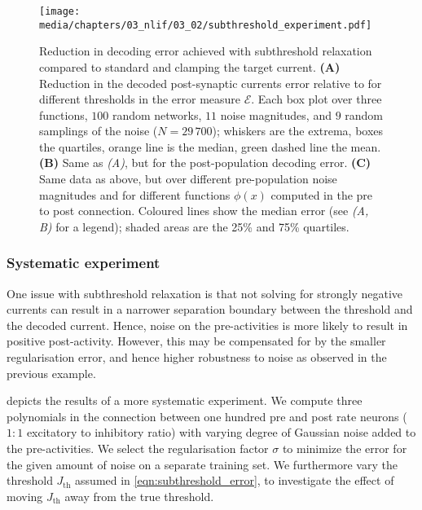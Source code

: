 \begin{figure}[t]
	\texttt{[image: media/chapters/03\_nlif/03\_02/subthreshold\_experiment.pdf]}%
	{\label{fig:subthreshold_experiment_a}}%
	{\label{fig:subthreshold_experiment_b}}%
	{\label{fig:subthreshold_experiment_c}}%
	\caption[Reduction in decoding error achieved with subthreshold relaxation]{Reduction in decoding error achieved with subthreshold relaxation compared to standard \NNLS and clamping the target current.
	\textbf{(A)} Reduction in the decoded post-synaptic currents error relative to \NNLS for different thresholds in the error measure $\mathcal{E}$.
	Each box plot over three functions, $100$ random networks, $11$ noise magnitudes, and $9$ random samplings of the noise ($N = 29\,700$); whiskers are the extrema, boxes the quartiles, orange line is the median, green dashed line the mean.
	\textbf{(B)}
	Same as \emph{(A)}, but for the post-population decoding error.
	\textbf{(C)} Same data as above, but over different pre-population noise magnitudes and for different functions $\phi(x)$ computed in the pre to post connection.
	Coloured lines show the median error (see \emph{(A, B)} for a legend); shaded areas are the 25\% and 75\% quartiles.
	}
	\label{fig:subthreshold_experiment}
\end{figure}

\subsubsection{Systematic experiment}
One issue with subthreshold relaxation is that not solving for strongly negative currents can result in a narrower separation boundary between the threshold and the decoded current.
Hence, noise on the pre-activities is more likely to result in positive post-activity.
However, this may be compensated for by the smaller regularisation error, and hence higher robustness to noise as observed in the previous example.

 depicts the results of a more systematic experiment.
We compute three polynomials in the connection between one hundred pre and post \LIF rate neurons ($1\!\!:\!\!1$ excitatory to inhibitory ratio) with varying degree of Gaussian noise added to the pre-activities.
We select the regularisation factor $\sigma$ to minimize the error for the given amount of noise on a separate training set.
We furthermore vary the threshold $J_\mathrm{th}$ assumed in \cref{eqn:subthreshold_error}, to investigate the effect of moving $J_\mathrm{th}$ away from the true threshold.

